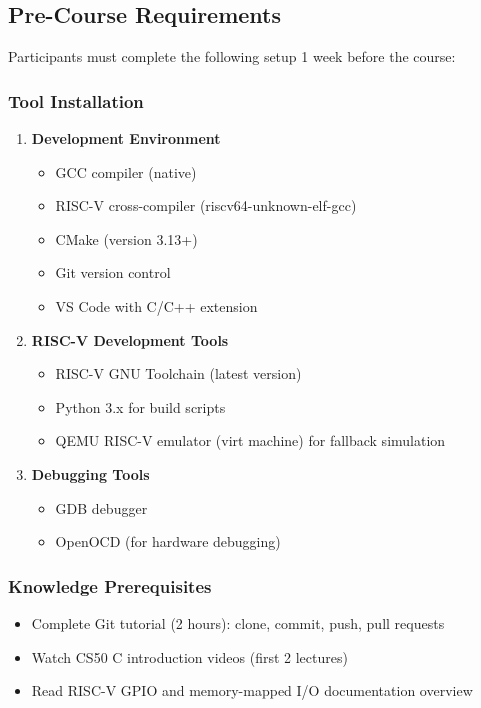 \documentclass[11pt,a4paper]{article}
\begin{document}
\subsection{Pre-Course Requirements}
Participants must complete the following setup 1 week before the course:

\subsubsection{Tool Installation}
\begin{enumerate}
    \item \textbf{Development Environment}
    \begin{itemize}
        \item GCC compiler (native)
        \item RISC-V cross-compiler (riscv64-unknown-elf-gcc)
        \item CMake (version 3.13+)
        \item Git version control
        \item VS Code with C/C++ extension
    \end{itemize}

    \item \textbf{RISC-V Development Tools}
    \begin{itemize}
        \item RISC-V GNU Toolchain (latest version)
        \item Python 3.x for build scripts
        \item QEMU RISC-V emulator (virt machine) for fallback simulation
    \end{itemize}

    \item \textbf{Debugging Tools}
    \begin{itemize}
        \item GDB debugger
        \item OpenOCD (for hardware debugging)
    \end{itemize}
\end{enumerate}

\subsubsection{Knowledge Prerequisites}
\begin{itemize}
    \item Complete Git tutorial (2 hours): clone, commit, push, pull requests
    \item Watch CS50 C introduction videos (first 2 lectures)
    \item Read RISC-V GPIO and memory-mapped I/O documentation overview
\end{itemize}
\end{document}

